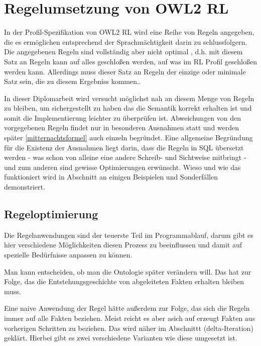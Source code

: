 \section{Regelumsetzung von OWL2 RL}

In der Profil-Spezifikation von OWL2 RL \cite{OWL2Profiles} wird eine Reihe von Regeln angegeben, die es ermöglichen entsprechend der Sprachmächtigkeit darin zu schlussfolgern.
Die angegebenen Regeln sind vollständig aber nicht optimal \cite{placeholder}, d.h. mit diesem Satz an Regeln kann auf alles geschloßen werden, auf was im RL Profil geschloßen werden kann. Allerdings muss dieser Satz an Regeln der einzige oder minimale Satz sein, die zu diesem Ergebniss kommen..

In dieser Diplomarbeit wird versucht möglichst nah an diesem Menge von Regeln zu bleiben, um sichergestellt zu haben das die Semantik korrekt erhalten ist und somit die Implementierung leichter zu überprüfen ist.
Abweichungen von den vorgegebenen Regeln findet nur in besonderen Ausnahmen statt und werden später \ref{mitternachtsformel} auch einzeln begründet. Eine allgemeine Begründung für die Existenz der Ausnahmen liegt darin, dass die Regeln in SQL übersetzt werden - was schon von alleine eine andere Schreib- und Sichtweise  mitbringt - und zum anderen sind gewisse Optimierungen erwünscht.
Wieso und wie das funktioniert wird in Abschnitt \cite{placeholder} an einigen Beispielen und Sonderfällen demonstriert.

\subsection{Regeloptimierung}

Die Regelanwendungen sind der teuerste Teil im Programmablauf, darum gibt es hier verschiedene Möglichkeiten diesen Prozess zu beeinflussen und damit auf spezielle Bedürfnisse anpassen zu können.

Man kann entscheiden, ob man die Ontologie später verändern will. Das hat zur Folge, das die Entstehungsgeschichte von abgeleiteten Fakten erhalten bleiben muss.

Eine naive Anwendung der Regel hätte außerdem zur Folge, das sich die Regeln immer auf alle Fakten beziehen. Meist reicht es aber asich auf erzeugt Fakten aus vorherigen Schritten zu beziehen. Das wird näher im Abschnittt \cite{placeholder} (delta-Iteration) geklärt. Hierbei gibt es zwei verschiedene Varianten wie diese umgesetzt ist.

